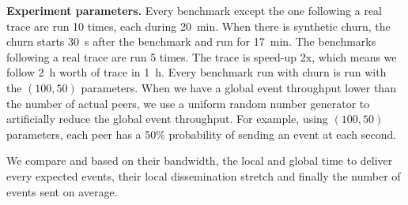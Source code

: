 \par
\textbf{Experiment parameters.} Every benchmark except the one following a real trace are run 10 times, each during \SI{20}{\minute}. When there is synthetic churn, the churn starts \SI{30}{\second} after the benchmark and run for \SI{17}{\minute}. The benchmarks following a real trace are run 5 times. The trace is speed-up 2x, which means we follow \SI{2}{\hour} worth of trace in \SI{1}{\hour}. Every benchmark run with churn is run with the $(100,50)$ parameters. When we have a global event throughput lower than the number of actual peers, we use a uniform random number generator to artificially reduce the global event throughput. For example, using $(100,50)$ parameters, each peer has a 50\% probability of sending an event at each second.
\par
We compare \epto and \jgroups based on their bandwidth, the local and global time to deliver every expected events, their local dissemination stretch and finally the number of events sent on average.
